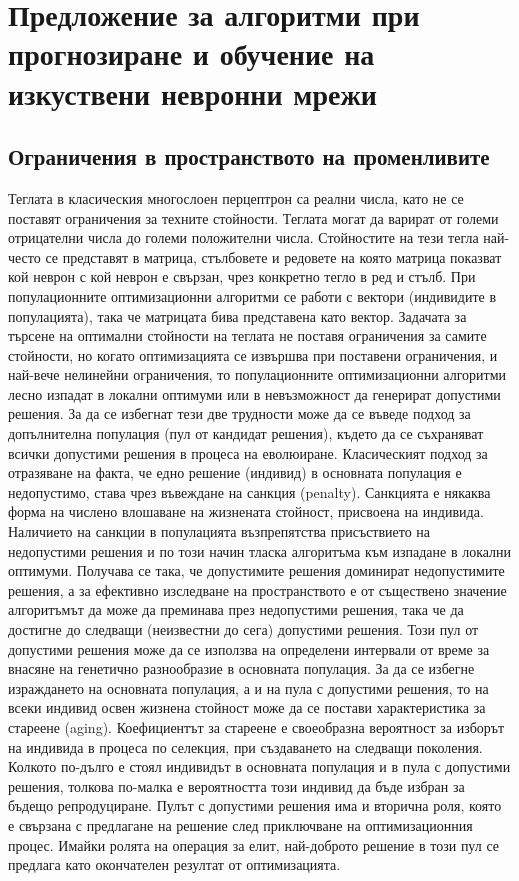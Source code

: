 ﻿\chapter{Предложение за алгоритми при прогнозиране и обучение на изкуствени невронни мрежи}

\section{Ограничения в пространството на променливите}

Теглата в класическия многослоен перцептрон са реални числа, като не се поставят ограничения за техните стойности. Теглата могат да варират от големи отрицателни числа до големи положителни числа. Стойностите на тези тегла най-често се представят в матрица, стълбовете и редовете на която матрица показват кой неврон с кой неврон е свързан, чрез конкретно тегло в ред и стълб. При популационните оптимизационни алгоритми се работи с вектори (индивидите в популацията), така че матрицата бива представена като вектор. Задачата за търсене на оптимални стойности на теглата не поставя ограничения за самите стойности, но когато оптимизацията се извършва при поставени ограничения, и най-вече нелинейни ограничения, то популационните оптимизационни алгоритми лесно изпадат в локални оптимуми или в невъзможност да генерират допустими решения. За да се избегнат тези две трудности може да се въведе подход за допълнителна популация (пул от кандидат решения), където да се съхраняват всички допустими решения в процеса на еволюиране. Класическият подход за отразяване на факта, че едно решение (индивид) в основната популация е недопустимо, става чрез въвеждане на санкция (penalty). Санкцията е някаква форма на числено влошаване на жизнената стойност, присвоена на индивида. Наличието на санкции в популацията възпрепятства присъствието на недопустими решения и по този начин тласка алгоритъма към изпадане в локални оптимуми. Получава се така, че допустимите решения доминират недопустимите решения, а за ефективно изследване на пространството е от съществено значение алгоритъмът да може да преминава през недопустими решения, така че да достигне до следващи (неизвестни до сега) допустими решения. Този пул от допустими решения може да се използва на определени интервали от време за внасяне на генетично разнообразие в основната популация. За да се избегне израждането на основната популация, а и на пула с допустими решения, то на всеки индивид освен жизнена стойност може да се постави характеристика за стареене (aging). Коефициентът за стареене е своеобразна вероятност за изборът на индивида в процеса по селекция, при създаването на следващи поколения. Колкото по-дълго е стоял индивидът в основната популация и в пула с допустими решения, толкова по-малка е вероятността този индивид да бъде избран за бъдещо репродуциране. Пулът с допустими решения има и вторична роля, която е свързана с предлагане на решение след приключване на оптимизационния процес. Имайки ролята на операция за елит, най-доброто решение в този пул се предлага като окончателен резултат от оптимизацията. 

